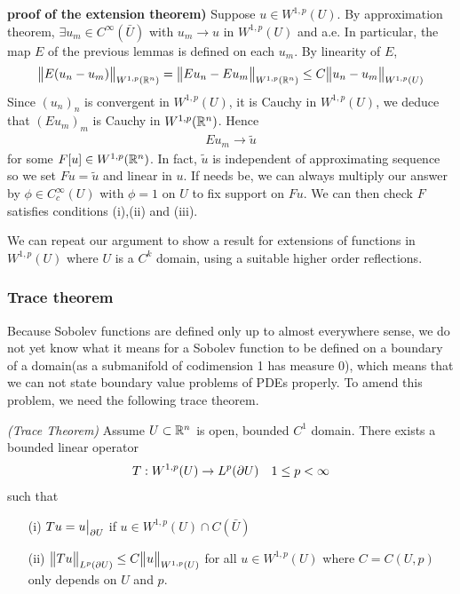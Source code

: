 \documentclass[12pt,a4paper]{report}
\newenvironment{proof}
{\begin{changemargin}{1cm}{0.5cm} 
	}%
	{\end{changemargin}
}
\begin{document}
\begin{proof}
\textbf{proof of the extension theorem) }  Suppose $u \in W^{1,p}(U)$. By approximation theorem, $\exists u_m \in C^{\infty}(\bar{U})$ with $u_m \rightarrow u$ in $W^{1,p}(U)$ and a.e. In particular, the map $E$ of the previous lemmas is defined on each $u_m$. By linearity of $E$,
\begin{align*}
\bigl\lVert E(u_n - u_m)\bigr\rVert_{W^{1,p}(\mathbb{R}^n)} = \bigl\lVert Eu_n - E u_m\bigr\rVert_{W^{1,p}(\mathbb{R}^n)} \leq C\bigl\lVert u_n - u_m\bigr\rVert_{W^{1,p}(U)}
\end{align*}
Since $(u_n)_n$ is convergent in $W^{1,p}(U)$, it is Cauchy in $W^{1,p}(U)$, we deduce that $(Eu_m)_m$ is Cauchy in $W^{1,p}(\mathbb{R}^n)$. Hence
\begin{align*}
E u_m \rightarrow \tilde{u}
\end{align*}
for some $F[u] \in W^{1,p}(\mathbb{R}^n)$. In fact, $\tilde{u}$ is independent of approximating sequence so we set $Fu = \tilde{u}$ and linear in $u$. If needs be, we can always multiply our answer by $\phi \in C_c^{\infty}(U)$ with $\phi =1$ on $U$ to fix support on $Fu$. We can then check $F$ satisfies conditions (i),(ii) and (iii).

\eop
\end{proof}
\s

We can repeat our argument to show a result for extensions of functions in $W^{1,p}(U)$ where $U$ is a $C^k$ domain, using a suitable higher order reflections.
\s

\subsubsection*{Trace theorem}

Because Sobolev functions are defined only up to almost everywhere sense, we do not yet know what it means for a Sobolev function to be defined on a boundary of a domain(as a submanifold of codimension 1 has measure 0), which means that we can not state boundary value problems of PDEs properly. To amend this problem, we need the following trace theorem.
\s

\thm \emph{(Trace Theorem)} Assume $U\subset \mathbb{R}^n$ is open, bounded $C^1$ domain. There exists a bounded linear operator
\begin{align*}
T : W^{1,p}(U) \rightarrow L^p(\partial U) \quad 1\leq p <\infty
\end{align*}
such that
\begin{itemize}
\item[(i)] $Tu = u \big|_{\partial U}$ if $u \in W^{1,p}(U) \cap C(\bar{U})$
\item[(ii)] $\bigl\lVert Tu\bigr\rVert_{L^p(\partial U)} \leq C\bigl\lVert u\bigr\rVert_{W^{1,p}(U)}$ for all $u\in W^{1,p}(U)$ where $C = C(U,p)$ only depends on $U$ and $p$.
\end{itemize}
\s
\end{document}
